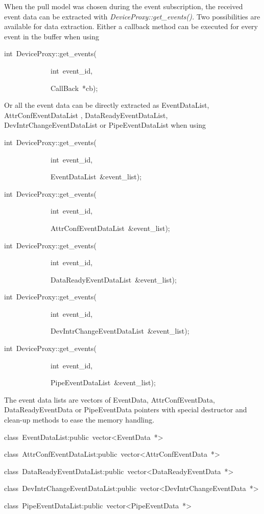 When the pull model was chosen during the event subscription, the
received event data can be extracted with \emph{DeviceProxy::get\_events().}
Two possibilities are available for data extraction. Either a callback
method can be executed for every event in the buffer when using
\begin{lyxcode}
int~DeviceProxy::get\_events(~

~~~~~~~~~~~~~int~event\_id,~

~~~~~~~~~~~~~CallBack~{*}cb);
\end{lyxcode}
Or all the event data can be directly extracted as EventDataList,
AttrConfEventDataList , DataReadyEventDataList,
DevIntrChangeEventDataList or PipeEventDataList
when using
\begin{lyxcode}
int~DeviceProxy::get\_events(~

~~~~~~~~~~~~~int~event\_id,~

~~~~~~~~~~~~~EventDataList~\&event\_list);



int~DeviceProxy::get\_events(~

~~~~~~~~~~~~~int~event\_id,~

~~~~~~~~~~~~~AttrConfEventDataList~\&event\_list);



int~DeviceProxy::get\_events(~

~~~~~~~~~~~~~int~event\_id,~

~~~~~~~~~~~~~DataReadyEventDataList~\&event\_list);



int~DeviceProxy::get\_events(~

~~~~~~~~~~~~~int~event\_id,~

~~~~~~~~~~~~~DevIntrChangeEventDataList~\&event\_list);



int~DeviceProxy::get\_events(~

~~~~~~~~~~~~~int~event\_id,~

~~~~~~~~~~~~~PipeEventDataList~\&event\_list);
\end{lyxcode}
The event data lists are vectors of EventData, AttrConfEventData,
DataReadyEventData or PipeEventData pointers with special destructor
and clean-up methods to ease the memory handling.
\begin{lyxcode}
class~EventDataList:public~vector<EventData~{*}>

class~AttrConfEventDataList:public~vector<AttrConfEventData~{*}>

class~DataReadyEventDataList:public~vector<DataReadyEventData~{*}>

class~DevIntrChangeEventDataList:public~vector<DevIntrChangeEventData~{*}>

class~PipeEventDataList:public~vector<PipeEventData~{*}>
\end{lyxcode}

